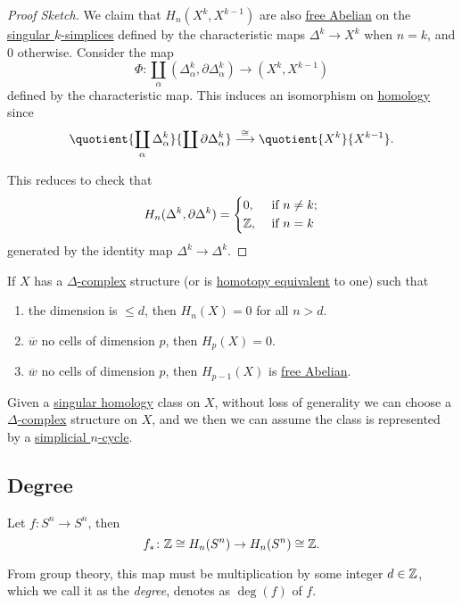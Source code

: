 \begin{proof}[Proof Sketch]
	We claim that \(H_n(X^k, X^{k - 1})\) are also \hyperref[def:free-Abelian-group]{free Abelian} on the
	\hyperref[def:singular-simplex]{singular \(k\)-simplices} defined by the characteristic maps \(\Delta^k \to X^k\) when \(n = k\),
	and \(0\) otherwise. Consider the map
	\[
		\Phi \colon \coprod_\alpha (\Delta^k_\alpha, \partial \Delta^k_\alpha) \to (X^k, X^{k - 1})
	\]
	defined by the characteristic map. This induces an isomorphism on \hyperref[def:homology-group]{homology} since
	\[
		\quotient{\coprod_\alpha \Delta_\alpha^k}{\coprod \partial \Delta_\alpha^k} \overset{\cong}{\longrightarrow}  \quotient{X^k}{X^{k - 1}}.
	\]

	This reduces to check that
	\[
		H_n(\Delta^k, \partial \Delta^k) = \begin{dcases}
			0,                           & \text{ if } n \neq k ; \\
			\mathbb{\MakeUppercase{z}} , & \text{ if } n=k
		\end{dcases}
	\]
	generated by the identity map \(\Delta^k \to \Delta^k\).
\end{proof}

\begin{corollary}
	If \(X\) has a \hyperref[def:delta-complex]{\(\Delta \)-complex} structure (or is
	\hyperref[def:homotopy-equivalence]{homotopy equivalent} to one) such that
	\begin{enumerate}
		\item the dimension is \(\leq d\), then \(H_n(X) = 0\) for all \(n>d\).
		\item \(\overline{w} \) no cells of dimension \(p\), then \(H_p(X) = 0\).
		\item \(\overline{w} \) no cells of dimension \(p\), then \(H_{p-1}(X)\) is \hyperref[def:free-Abelian-group]{free Abelian}.
	\end{enumerate}
\end{corollary}

\begin{corollary}
	Given a \hyperref[def:singular-homology-group]{singular homology} class on \(X\), without loss of generality we can choose a
	\hyperref[def:delta-complex]{\(\Delta \)-complex} structure on \(X\), and we then we can assume the class is represented by a
	\hyperref[def:simplicial-complex]{simplicial \(n\)-cycle}.
\end{corollary}

\subsection{Degree}
\begin{definition}[Degree]\label{def:degree}
	Let \(f \colon S^n \to S^n\), then
	\[
		f_\ast \colon \mathbb{\MakeUppercase{z}} \cong H_n(S^n) \to H_n(S^n) \cong \mathbb{\MakeUppercase{z}}.
	\]

	From group theory, this map must be multiplication by some integer \(d \in \mathbb{\MakeUppercase{z}}\), which we call it as the
	\emph{degree}, denotes as \(\deg(f)\) of \(f\).
\end{definition}

